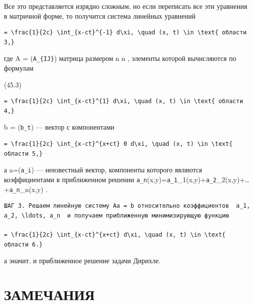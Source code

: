 \documentclass[
  ukrainian,
]{article}
\begin{document}
Все это представляется изрядно сложным, но если переписать все эти
уравнения в матричной форме, то получится система линейных уравнений

\begin{verbatim}
= \frac{1}{2c} \int_{x-ct}^{-1} d\xi, \quad (x, t) \in \text{ области 3,}
\end{verbatim}

где A = (\texttt{A\_\{IJ\}}) матрица размером n \times n , элементы
которой вычисляются по формулам

(45.3)

\begin{verbatim}
= \frac{1}{2c} \int_{x-ct}^{1} d\xi, \quad (x, t) \in \text{ области 4,}
\end{verbatim}

b = (\texttt{b\_t}) --- вектор с компонентами

\begin{verbatim}
= \frac{1}{2c} \int_{x-ct}^{x+ct} 0 d\xi, \quad (x, t) \in \text{ области 5,}
\end{verbatim}

а a=(\texttt{a\_i}) --- неизвестный вектор, компоненты которого являются
коэффициентами в приближенном решении
\texttt{a\_n}(x,y)=\texttt{a\_1}\varphi\_1(x,y)+\texttt{a\_2}\varphi\_2(x,y)+\ldots+\texttt{a\_n}\varphi\_n(x,y)
.

\begin{verbatim}
ШАГ 3. Решаем линейную систему Aa = b относительно коэффициентов  a_1, a_2, \ldots, a_n  и получаем приближенную минимизирующую функцию

= \frac{1}{2c} \int_{x-ct}^{x+ct} d\xi, \quad (x, t) \in \text{ области 6.}
\end{verbatim}

а эначит, и приближенное решение задачи Дирихле.

\section{ЗАМЕЧАНИЯ}\label{ux437ux430ux43cux435ux447ux430ux43dux438ux44f-4}
\end{document}
